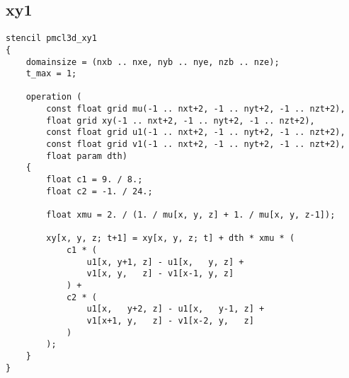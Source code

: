 \subsection{xy1}
\begin{lstlisting}[language=stencil]
stencil pmcl3d_xy1
{
	domainsize = (nxb .. nxe, nyb .. nye, nzb .. nze);
	t_max = 1;
	
	operation (
		const float grid mu(-1 .. nxt+2, -1 .. nyt+2, -1 .. nzt+2),
		float grid xy(-1 .. nxt+2, -1 .. nyt+2, -1 .. nzt+2),
		const float grid u1(-1 .. nxt+2, -1 .. nyt+2, -1 .. nzt+2),
		const float grid v1(-1 .. nxt+2, -1 .. nyt+2, -1 .. nzt+2), 
		float param dth)
	{
		float c1 = 9. / 8.;
		float c2 = -1. / 24.;

		float xmu = 2. / (1. / mu[x, y, z] + 1. / mu[x, y, z-1]);

		xy[x, y, z; t+1] = xy[x, y, z; t] + dth * xmu * (
			c1 * (
				u1[x, y+1, z] - u1[x,   y, z] +
				v1[x, y,   z] - v1[x-1, y, z]
			) +
			c2 * (
				u1[x,   y+2, z] - u1[x,   y-1, z] +
				v1[x+1, y,   z] - v1[x-2, y,   z]
			)
		);
	}
}
\end{lstlisting}

